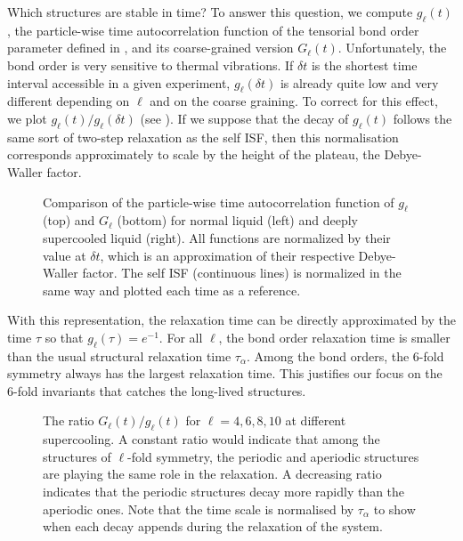 Which structures are stable in time? To answer this question, we compute $g_\ell(t)$, the particle-wise time autocorrelation function of the tensorial bond order parameter defined in , and its coarse-grained version $G_\ell(t)$. Unfortunately, the bond order is very sensitive to thermal vibrations. If $\delta t$ is the shortest time interval accessible in a given experiment, $g_\ell(\delta t)$ is already quite low and very different depending on $\ell$ and on the coarse graining. To correct for this effect, we plot $g_\ell(t)/g_\ell(\delta t)$ (see ). If we suppose that the decay of $g_\ell(t)$ follows the same sort of two-step relaxation as the self \ac{ISF}, then this normalisation corresponds approximately to scale by the height of the plateau,  the Debye-Waller factor.

\begin{figure}
	\centering
	\resizebox{0.8\textwidth}{!}{}
	\caption{Comparison of the particle-wise time autocorrelation function of $g_\ell$ (top) and $G_\ell$ (bottom) for normal liquid (left) and deeply supercooled liquid (right). All functions are normalized by their value at $\delta t$, which is an approximation of their respective Debye-Waller factor. The self \acs{ISF} (continuous lines) is normalized in the same way and plotted each time as a reference.}
	\label{fig:Qlm_corr}
\end{figure}

With this representation, the relaxation time can be directly approximated by the time $\tau$ so that $g_\ell(\tau)=e^{-1}$. For all $\ell$, the bond order relaxation time is smaller than the usual structural relaxation time $\tau_\alpha$. Among the bond orders, the 6-fold symmetry always has the largest relaxation time. This justifies our focus on the 6-fold invariants that catches the long-lived structures.

\begin{figure}
	\centering
	\resizebox{0.8\textwidth}{!}{}
	\caption{The ratio $G_\ell(t)/g_\ell(t)$ for $\ell=4,6,8,10$ at different supercooling. A constant ratio would indicate that among the structures of $\ell$-fold symmetry, the periodic and aperiodic structures are playing the same role in the relaxation. A decreasing ratio indicates that the periodic structures decay more rapidly than the aperiodic ones. Note that the time scale is normalised by $\tau_\alpha$ to show when each decay appends during the relaxation of the system.}
	\label{fig:Qlm_qlm_correl_ratio}
\end{figure}

